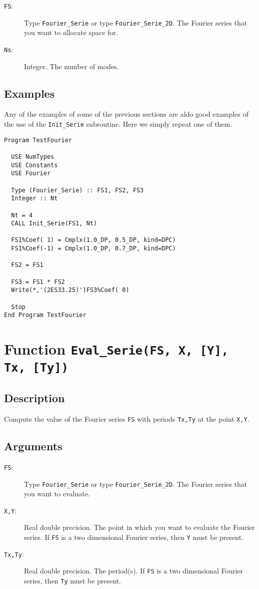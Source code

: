 \begin{description}
\item[\texttt{FS}:] Type \texttt{Fourier\_Serie} or type
  \texttt{Fourier\_Serie\_2D}. The Fourier series that you want
  to allocate space for.
\item[\texttt{Ns}:] Integer. The number of modes.
\end{description}

\subsection{Examples}

Any of the examples of some of the previous sections are aldo good
examples of the use of the \texttt{Init\_Serie} subroutine. Here we
simply repeat one of them.

\begin{verbatim}
Program TestFourier

  USE NumTypes
  USE Constants
  USE Fourier

  Type (Fourier_Serie) :: FS1, FS2, FS3
  Integer :: Nt

  Nt = 4
  CALL Init_Serie(FS1, Nt)

  FS1%Coef( 1) = Cmplx(1.0_DP, 0.5_DP, kind=DPC)
  FS1%Coef(-1) = Cmplx(1.0_DP, 0.7_DP, kind=DPC)
  
  FS2 = FS1  

  FS3 = FS1 * FS2
  Write(*,'(2ES33.25)')FS3%Coef( 0)

  Stop
End Program TestFourier
\end{verbatim}

\section{Function \texttt{Eval\_Serie(FS, X, [Y], Tx, [Ty]) }}

\subsection{Description}

Compute the value of the Fourier series \texttt{FS} with periods
\texttt{Tx,Ty} at the point \texttt{X,Y}. 

\subsection{Arguments}

\begin{description}
\item[\texttt{FS}:] Type \texttt{Fourier\_Serie} or type
  \texttt{Fourier\_Serie\_2D}. The Fourier series that you want to evaluate.
\item[\texttt{X,Y}:] Real double precision. The point in which you
  want to evaluate the Fourier series. If \texttt{FS} is a two
  dimensional Fourier series, then \texttt{Y} must be present.
\item[\texttt{Tx,Ty}:] Real double precision. The period(s). If
  \texttt{FS} is a two dimensional Fourier series, then \texttt{Ty}
  must be present. 
\end{description}

